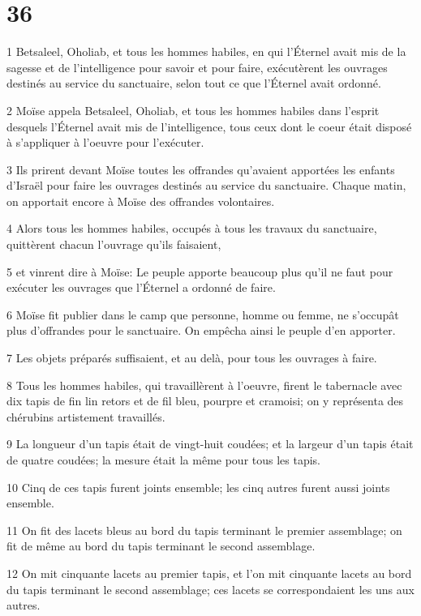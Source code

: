 \chapter{36}

\par 1 Betsaleel, Oholiab, et tous les hommes habiles, en qui l'Éternel avait mis de la sagesse et de l'intelligence pour savoir et pour faire, exécutèrent les ouvrages destinés au service du sanctuaire, selon tout ce que l'Éternel avait ordonné.
\par 2 Moïse appela Betsaleel, Oholiab, et tous les hommes habiles dans l'esprit desquels l'Éternel avait mis de l'intelligence, tous ceux dont le coeur était disposé à s'appliquer à l'oeuvre pour l'exécuter.
\par 3 Ils prirent devant Moïse toutes les offrandes qu'avaient apportées les enfants d'Israël pour faire les ouvrages destinés au service du sanctuaire. Chaque matin, on apportait encore à Moïse des offrandes volontaires.
\par 4 Alors tous les hommes habiles, occupés à tous les travaux du sanctuaire, quittèrent chacun l'ouvrage qu'ils faisaient,
\par 5 et vinrent dire à Moïse: Le peuple apporte beaucoup plus qu'il ne faut pour exécuter les ouvrages que l'Éternel a ordonné de faire.
\par 6 Moïse fit publier dans le camp que personne, homme ou femme, ne s'occupât plus d'offrandes pour le sanctuaire. On empêcha ainsi le peuple d'en apporter.
\par 7 Les objets préparés suffisaient, et au delà, pour tous les ouvrages à faire.
\par 8 Tous les hommes habiles, qui travaillèrent à l'oeuvre, firent le tabernacle avec dix tapis de fin lin retors et de fil bleu, pourpre et cramoisi; on y représenta des chérubins artistement travaillés.
\par 9 La longueur d'un tapis était de vingt-huit coudées; et la largeur d'un tapis était de quatre coudées; la mesure était la même pour tous les tapis.
\par 10 Cinq de ces tapis furent joints ensemble; les cinq autres furent aussi joints ensemble.
\par 11 On fit des lacets bleus au bord du tapis terminant le premier assemblage; on fit de même au bord du tapis terminant le second assemblage.
\par 12 On mit cinquante lacets au premier tapis, et l'on mit cinquante lacets au bord du tapis terminant le second assemblage; ces lacets se correspondaient les uns aux autres.

